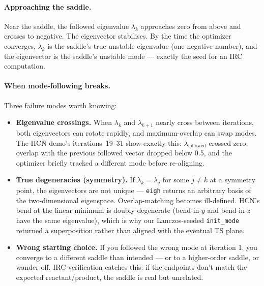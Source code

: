 \documentclass[11pt]{article}
\begin{document}
\paragraph{Approaching the saddle.}
Near the saddle, the followed eigenvalue $\lambda_k$ approaches zero from
above and crosses to negative.  The eigenvector stabilises.  By the time the
optimizer converges, $\lambda_k$ is the saddle's true unstable eigenvalue
(one negative number), and the eigenvector is the saddle's unstable mode ---
exactly the seed for an IRC computation.

\paragraph{When mode-following breaks.}  Three failure modes worth knowing:
\begin{itemize}
  \item \textbf{Eigenvalue crossings.}  When $\lambda_k$ and $\lambda_{k+1}$
        nearly cross between iterations, both eigenvectors can rotate
        rapidly, and maximum-overlap can swap modes.  The HCN demo's
        iterations~19--31 show exactly this: $\lambda_{\text{followed}}$
        crossed zero, overlap with the previous followed vector dropped
        below 0.5, and the optimizer briefly tracked a different mode
        before re-aligning.
  \item \textbf{True degeneracies (symmetry).}  If $\lambda_k = \lambda_j$
        for some $j \neq k$ at a symmetry point, the eigenvectors are not
        unique --- \texttt{eigh} returns an arbitrary basis of the
        two-dimensional eigenspace.  Overlap-matching becomes ill-defined.
        HCN's bend at the linear minimum is doubly degenerate (bend-in-$y$
        and bend-in-$z$ have the same eigenvalue), which is why our
        Lanczos-seeded \texttt{init\_mode} returned a superposition rather
        than aligned with the eventual TS plane.
  \item \textbf{Wrong starting choice.}  If you followed the wrong mode
        at iteration 1, you converge to a different saddle than intended
        --- or to a higher-order saddle, or wander off.  IRC verification
        catches this: if the endpoints don't match the expected
        reactant/product, the saddle is real but unrelated.
\end{itemize}
\end{document}
